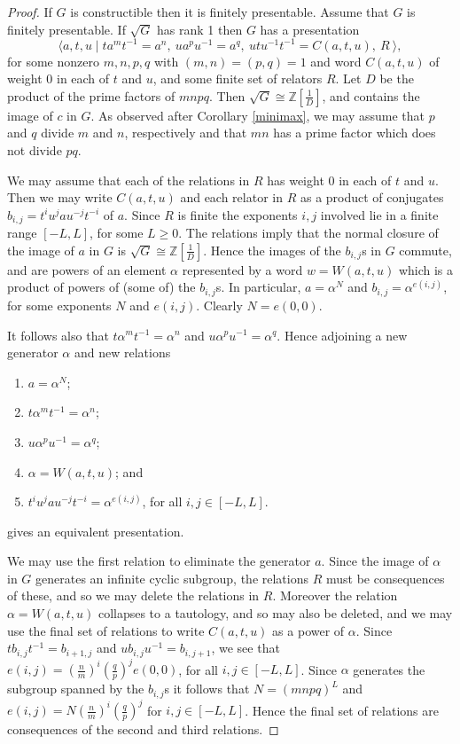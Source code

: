 \documentclass[12pt]{amsart}
\renewcommand{\geq}{\geqslant}
\begin{document}
\begin{proof}
If $G$ is constructible then it is finitely presentable.
Assume that $G$ is finitely presentable.
If $\sqrt{G}$ has rank 1 then $G$ has a presentation
\[
\langle{a,t,u}\mid {ta^mt^{-1}=a^n},~ua^pu^{-1}=a^q,~utu^{-1}t^{-1}=C(a,t,u),~
R~
\rangle,
\]
for some nonzero $m,n,p,q$ with $(m,n)=(p,q)=1$ 
and word $C(a,t,u)$ of weight 0 in each of $t$ and $u$,
and some finite set of relators $R$.
Let $D$ be the product of the prime factors of $mnpq$.
Then $\sqrt{G}\cong\mathbb{Z}[\frac1D]$,
and contains the image of $c$ in $G$.
As observed after Corollary \ref{minimax}, we may assume that
$p$ and $q$ divide $m$ and $n$, respectively
and that $mn$ has a prime factor which does not divide $pq$.

We may assume that each of the relations in $R$ has weight 0 in each of $t$ and $u$.
Then we may write $C(a,t,u)$ and each relator in $R$ as 
a product of conjugates $b_{i,j}=t^iu^jau^{-j}t^{-i}$ of $a$.
Since $R$ is finite the exponents $i,j$ involved lie in a finite range 
$[-L,L]$, for some $L\geq0$.
The relations imply that the normal closure of the image of 
$a$ in $G$ is $\sqrt{G}\cong\mathbb{Z}[\frac1D]$.
Hence the images of the $b_{i,j}$s in $G$ commute,
and are powers of an element $\alpha$ represented by a word $w=W(a,t,u)$
which is a product of powers of (some of) the $b_{i,j}$s.
In particular, $a=\alpha^N$ and  $b_{i,j}=\alpha^{e(i,j)}$,
for some exponents $N$ and $e(i,j)$. 
Clearly $N=e(0,0)$.

It follows also that $t\alpha^mt^{-1}=\alpha^n$ and $u\alpha^pu^{-1}=\alpha^q$.
Hence adjoining a new generator $\alpha$ and new relations 
\begin{enumerate}
\item$a=\alpha^N$; 
\item$t\alpha^mt^{-1}=\alpha^n$;
\item$u\alpha^pu^{-1}=\alpha^q$; 
\item$\alpha=W(a,t,u)$;
and 
\item
$t^iu^jau^{-j}t^{-i}=\alpha^{e(i,j)}$, for all $i,j\in[-L,L]$.
\end{enumerate}
gives an equivalent presentation.

We may use the first relation to eliminate the generator $a$.
Since the image of $\alpha$ in $G$ generates an infinite cyclic subgroup,
the relations $R$ must be consequences of these,
and so we may delete the relations in $R$.
Moreover the relation $\alpha=W(a,t,u)$ collapses to a tautology,
and so may also be deleted, 
and we may use the final set of relations to write $C(a,t,u)$ as a power of $\alpha$.
Since $tb_{i,j}t^{-1}=b_{i+1,j}$ and $ub_{i,j}u^{-1}=b_{i,j+1}$,
we see that $e(i,j)=(\frac{n}m)^i(\frac{q}p)^je(0,0)$, for all $i,j\in[-L,L]$.
Since $\alpha$ generates the subgroup spanned by the $b_{i,j}$s it follows that
$N=(mnpq)^L$ and $e(i,j)=N(\frac{n}m)^i(\frac{q}p)^j$ for $i,j\in[-L,L]$.
Hence the final set of relations are consequences of the second and third relations.


\end{proof}
\end{document}
